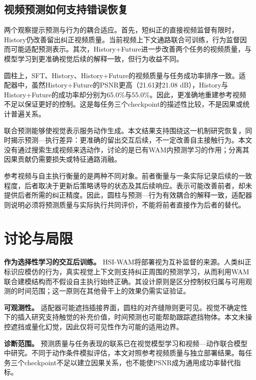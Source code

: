 \documentclass[letterpaper,10pt,conference]{ieeeconf}
\begin{document}
\subsection{视频预测如何支持错误恢复}
两个观察提示预测与行为的耦合适应。首先，短纠正的直接视频监督有限时，History仍改善留出纠正视频质量。当前视频上下文通路联合可训练，行为监督因而可能适配预测表示。其次，History+Future进一步改善两个任务的视频质量，与模型学习到更准确视觉后续的解释一致，但行为收益不同。

圆柱上，SFT、History、History+Future的视频质量与任务成功率排序一致。适配器中，虽然History+Future的PSNR更高（21.61对21.08 dB），History与History+Future的成功率却分别为65.0\%与55.0\%。因此，更准确地重建参考视频不足以保证更好的控制。这是每任务三个checkpoint的描述性比较，不是因果或统计普遍关系。

联合预测能够使视觉表示服务动作生成\cite{videovla}。本文结果支持围绕这一机制研究恢复，同时揭示预测—执行差异：更准确的留出交互后续，不一定改善自主接触行为。本文没有通过搜索生成视频来选动作，讨论的是已有WAM内预测学习的作用；分离其因果贡献仍需要损失或特征通路消融。

参考视频与自主执行衡量的是两种不同对象。前者衡量与一条实际记录后续的一致程度，后者取决于更新后策略诱导的状态及其后续响应。表示可能改善前者，却未提供后者所需的纠正精度。因此，圆柱与预测—行为有效耦合的解释一致，适配器则说明必须将预测质量与实际执行共同评价，不能将前者直接作为后者的替代。

\section{讨论与局限}

\textbf{作为选择性学习的交互后训练。} HSI-WAM将部署视为互补监督的来源。人类纠正标识应模仿的行为，真实视觉上下文则支持纠正周围的预测学习，从而利用WAM联合建模结构而不假设自主执行始终正确。其设计原则是区分控制权归属与可用观测的时间范围；这一原则在其他骨干上的效果仍需实证验证。


\textbf{可观测性。} 适配器可能遮挡插接界面，圆柱的对齐缝隙则更可见。视觉不确定性下的插入研究支持触觉的补充价值\cite{visiontouch}，时间预测也可能帮助跟踪遮挡物体\cite{temporalplanning}。本文未操控遮挡或量化幻觉，因此仅将可见性作为可能的适用边界。

\textbf{诊断范围。} 预测质量与任务表现的联系已在视觉模型学习和视频—动作联合模型中研究\cite{modelspixels,videovla}。不同于动作条件模拟评估\cite{worldgym}，本文对照参考视频质量与独立部署结果。每任务三个checkpoint不足以建立因果关系，也不能使PSNR成为通用成功率替代指标。
\end{document}
